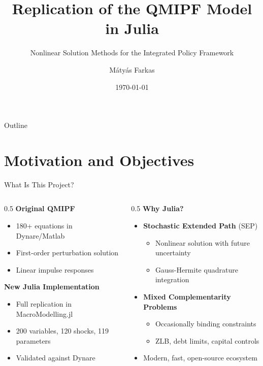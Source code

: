 \documentclass[aspectratio=169,12pt]{beamer}
\title[QMIPF Julia]{Replication of the QMIPF Model in Julia}
\subtitle{Nonlinear Solution Methods for the Integrated Policy Framework}
\author{M\'aty\'as Farkas}
\institute{International Monetary Fund}
\date{\today}
\begin{document}
\begin{frame}
\titlepage
\end{frame}

\begin{frame}{Outline}
\tableofcontents
\end{frame}

\section{Motivation and Objectives}

\begin{frame}{What Is This Project?}

\begin{columns}[T]
\begin{column}{0.5\textwidth}
\textbf{Original QMIPF} \citep{adrian2021quantitative}
\begin{itemize}
\item 180+ equations in Dynare/Matlab
\item First-order perturbation solution
\item Linear impulse responses
\end{itemize}

\vspace{0.5cm}
\textbf{New Julia Implementation}
\begin{itemize}
\item Full replication in MacroModelling.jl
\item 200 variables, 120 shocks, 119 parameters
\item Validated against Dynare
\end{itemize}
\end{column}

\begin{column}{0.5\textwidth}
\textbf{Why Julia?}
\begin{itemize}
\item \textcolor{imfblue}{\textbf{Stochastic Extended Path}} (SEP)
\begin{itemize}
\item Nonlinear solution with future uncertainty
\item Gauss-Hermite quadrature integration
\end{itemize}
\item \textcolor{imfblue}{\textbf{Mixed Complementarity Problems}}
\begin{itemize}
\item Occasionally binding constraints
\item ZLB, debt limits, capital controls
\end{itemize}
\item Modern, fast, open-source ecosystem
\end{itemize}
\end{column}
\end{columns}


\end{frame}
\end{document}
